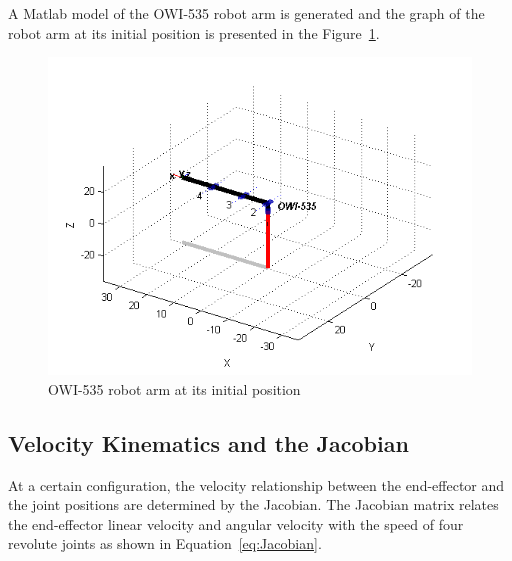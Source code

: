 \documentclass[paper=letter, fontsize=10pt]{scrartcl}	%
\numberwithin{equation}{section}															%
\numberwithin{figure}{section}																%
\numberwithin{table}{section}																%
\begin{document}
A Matlab model of the OWI-535 robot arm is generated and the graph of the robot arm at its initial position is presented in the Figure~\ref{fig:OWI_INITIAL_POSITION}.

\begin{figure}[h!]
  \centering
    \includegraphics[width=.5\textwidth]{./Images/OWI_INITIAL_POSITION}
    \caption{OWI-535 robot arm at its initial position}
    \label{fig:OWI_INITIAL_POSITION}
\end{figure}
\subsection{Velocity Kinematics and the Jacobian}
At a certain configuration, the velocity relationship between the end-effector and the joint positions are determined by the Jacobian. The Jacobian matrix relates the end-effector linear velocity and angular velocity with the speed of four revolute joints as shown in Equation~\eqref{eq:Jacobian}.
\end{document}
